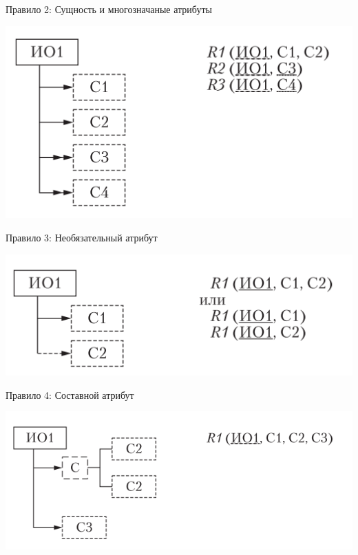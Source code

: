 \documentclass{beamer}
\begin{document}
\begin{frame}{Правило 2: Сущность и многозначаные атрибуты}
\begin{center}
\includegraphics[scale=0.75]{images/lec03-pic12.png}
\end{center}
\end{frame}

\begin{frame}{Правило 3: Необязательный атрибут}
\begin{center}
\includegraphics[scale=0.75]{images/lec03-pic13.png}
\end{center}
\end{frame}

\begin{frame}{Правило 4: Составной атрибут}
\begin{center}
\includegraphics[scale=0.75]{images/lec03-pic14.png}
\end{center}
\end{frame}
\end{document}
